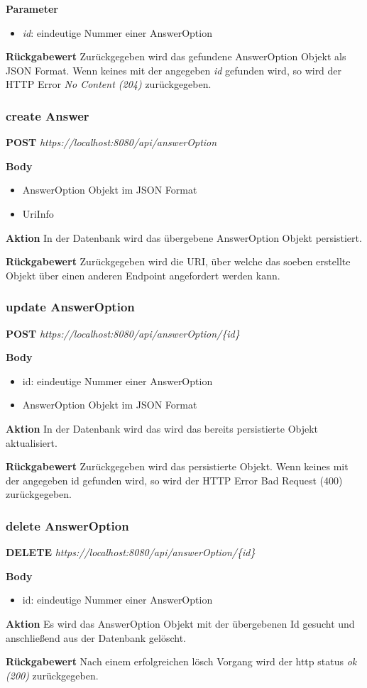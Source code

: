 \textbf{Parameter}
\begin{itemize}
    \item \emph{id}: eindeutige Nummer einer AnswerOption
\end{itemize}

\textbf{Rückgabewert}
Zurückgegeben wird das gefundene AnswerOption Objekt als JSON Format. Wenn keines mit der angegeben \emph{id} gefunden wird, so wird der
HTTP Error \emph{No Content (204)} zurückgegeben.

\subsubsection{create Answer}
\textbf{POST} \emph{https://localhost:8080/api/answerOption}

\textbf{Body}
\begin{itemize}
    \item AnswerOption Objekt im JSON Format
    \item UriInfo
\end{itemize}

\textbf{Aktion}
In der Datenbank wird das übergebene AnswerOption Objekt persistiert.

\textbf{Rückgabewert}
Zurückgegeben wird die URI, über welche das soeben erstellte Objekt über einen anderen Endpoint angefordert werden kann.

\subsubsection{update AnswerOption}
\textbf{POST} \emph{https://localhost:8080/api/answerOption/\{id\}}

\textbf{Body}
\begin{itemize}
    \item id: eindeutige Nummer einer AnswerOption
    \item AnswerOption Objekt im JSON Format
\end{itemize}

\textbf{Aktion}
In der Datenbank wird das wird das bereits persistierte Objekt aktualisiert.

\textbf{Rückgabewert}
Zurückgegeben wird das persistierte Objekt. Wenn keines mit der angegeben id gefunden wird, so wird der HTTP Error Bad Request
(400) zurückgegeben.

\subsubsection{delete AnswerOption}
\textbf{DELETE} \emph{https://localhost:8080/api/answerOption/\{id\}}

\textbf{Body}
\begin{itemize}
    \item id: eindeutige Nummer einer AnswerOption
\end{itemize}

\textbf{Aktion}
Es wird das AnswerOption Objekt mit der übergebenen Id gesucht und anschließend
aus der Datenbank gelöscht.

\textbf{Rückgabewert}
Nach einem erfolgreichen lösch Vorgang wird der http status \emph{ok (200)} zurückgegeben.

